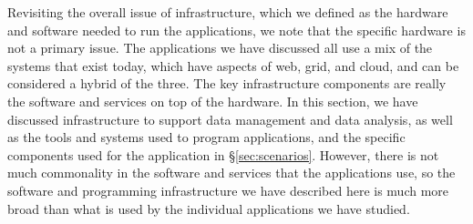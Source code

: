 Revisiting the overall issue of infrastructure, which we defined as
the hardware and software needed to run the applications, we
note that the specific hardware is not a primary issue.  The
applications we have discussed all use a mix of the systems that exist
today, which have aspects of web, grid, and cloud, and can be
considered a hybrid of the three.  The key infrastructure components
are really the software and services on top of the hardware.  In this
section, we have discussed infrastructure to support data management and
data analysis, as well as the tools and systems used to program
applications, and the specific components used for the application in
\S\ref{sec:scenarios}.  However, there is not much commonality in the
software and services that the applications use, so the software and programming infrastructure
we have described here is much more broad than what is used by the
individual applications we have studied.



